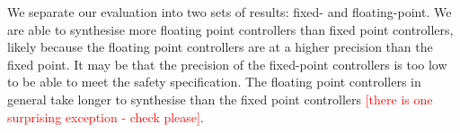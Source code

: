 \documentclass[twocolumn]{autart}    %
\renewcommand{\note}[1]{\textcolor{red}{[#1]}}
\begin{document}
We separate our evaluation into two sets of results: fixed- and floating-point. 
We are able to synthesise more floating point controllers than fixed point controllers, likely because the
floating point controllers are at a higher precision than the fixed point. It may be that the precision of the fixed-point
controllers is too low to be able to meet the safety specification. The floating point controllers in general take longer to synthesise
than the fixed point controllers \note{there is one surprising exception - check please}.
\end{document}
